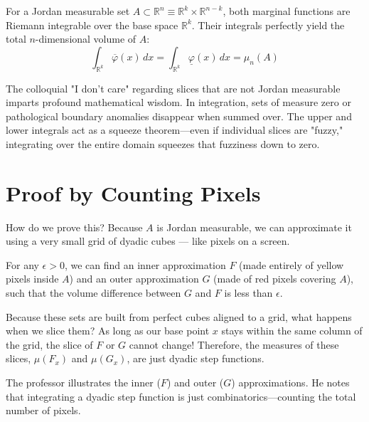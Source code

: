 \begin{orange-formula}
\begin{theorem}
For a Jordan measurable set $A \subset \mathbb{R}^n \equiv \mathbb{R}^k \times \mathbb{R}^{n-k}$, both marginal functions are Riemann integrable over the base space $\mathbb{R}^k$. Their integrals perfectly yield the total $n$-dimensional volume of $A$:
\[
\int_{\mathbb{R}^k} \overline{\varphi}(x) \, dx = \int_{\mathbb{R}^k} \underline{\varphi}(x) \, dx = \mu_n(A)
\]
\end{theorem}
\end{orange-formula}

\begin{didactic-insight}
The colloquial "I don't care" regarding slices that are not Jordan measurable imparts profound mathematical wisdom. In integration, sets of measure zero or pathological boundary anomalies disappear when summed over. The upper and lower integrals act as a squeeze theorem—even if individual slices are "fuzzy," integrating over the entire domain squeezes that fuzziness down to zero.
\end{didactic-insight}

\section{Proof by Counting Pixels}

\begin{spoken-clean}[00:46:30 - 00:52:00]
How do we prove this? Because $A$ is Jordan measurable, we can approximate it using a very small grid of dyadic cubes — like pixels on a screen. 

For any $\epsilon > 0$, we can find an inner approximation $F$ (made entirely of yellow pixels inside $A$) and an outer approximation $G$ (made of red pixels covering $A$), such that the volume difference between $G$ and $F$ is less than $\epsilon$.

Because these sets are built from perfect cubes aligned to a grid, what happens when we slice them? As long as our base point $x$ stays within the same column of the grid, the slice of $F$ or $G$ cannot change! Therefore, the measures of these slices, $\mu(F_x)$ and $\mu(G_x)$, are just dyadic step functions. 
\end{spoken-clean}

\begin{nice-box}
The professor illustrates the inner ($F$) and outer ($G$) approximations. He notes that integrating a dyadic step function is just combinatorics—counting the total number of pixels.
\end{nice-box}

